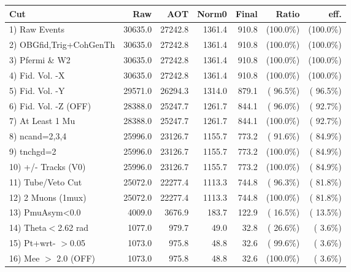  \begin{table}[h!]\centering
 \begin{tabular}{||l||r|r|r|r|r|r||}
 \hline
 \hline
 Cut & Raw & AOT & Norm0 & Final & Ratio & eff.       \\
 \hline
  1) Raw Events           &      30635.0 &      27242.8 &       1361.4 &        910.8 & (100.0\%) & (100.0\%) \\
  2) OBGfid,Trig+CohGenTh &      30635.0 &      27242.8 &       1361.4 &        910.8 & (100.0\%) & (100.0\%) \\
  3) Pfermi \& W2         &      30635.0 &      27242.8 &       1361.4 &        910.8 & (100.0\%) & (100.0\%) \\
  4) Fid. Vol. -X         &      30635.0 &      27242.8 &       1361.4 &        910.8 & (100.0\%) & (100.0\%) \\
  5) Fid. Vol. -Y         &      29571.0 &      26294.3 &       1314.0 &        879.1 & ( 96.5\%) & ( 96.5\%) \\
  6) Fid. Vol. -Z (OFF)   &      28388.0 &      25247.7 &       1261.7 &        844.1 & ( 96.0\%) & ( 92.7\%) \\
  7) At Least 1 Mu        &      28388.0 &      25247.7 &       1261.7 &        844.1 & (100.0\%) & ( 92.7\%) \\
  8) ncand=2,3,4          &      25996.0 &      23126.7 &       1155.7 &        773.2 & ( 91.6\%) & ( 84.9\%) \\
  9) tnchgd=2             &      25996.0 &      23126.7 &       1155.7 &        773.2 & (100.0\%) & ( 84.9\%) \\
 10) +/- Tracks (V0)      &      25996.0 &      23126.7 &       1155.7 &        773.2 & (100.0\%) & ( 84.9\%) \\
 11) Tube/Veto Cut        &      25072.0 &      22277.4 &       1113.3 &        744.8 & ( 96.3\%) & ( 81.8\%) \\
 12) 2 Muons (1mux)       &      25072.0 &      22277.4 &       1113.3 &        744.8 & (100.0\%) & ( 81.8\%) \\
 13) PmuAsym<0.0          &       4009.0 &       3676.9 &        183.7 &        122.9 & ( 16.5\%) & ( 13.5\%) \\
 14) Theta$<$2.62 rad     &       1077.0 &        979.7 &         49.0 &         32.8 & ( 26.6\%) & (  3.6\%) \\
 15) Pt+wrt- $>$0.05      &       1073.0 &        975.8 &         48.8 &         32.6 & ( 99.6\%) & (  3.6\%) \\
 16) Mee $>$ 2.0  (OFF)   &       1073.0 &        975.8 &         48.8 &         32.6 & (100.0\%) & (  3.6\%) \\

\end{tabular}
\end{table}
